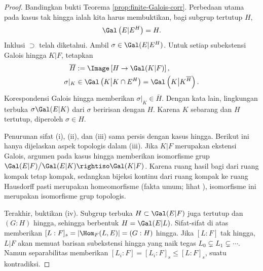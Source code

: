 \begin{proof}
	Bandingkan bukti Teorema \ref{prop:finite-Galois-corr}. Perbedaan utama pada kasus tak hingga ialah kita harus membuktikan, bagi subgrup tertutup $H$,
	\[ \Gal\left( E|E^H \right) = H. \]
	Inklusi $\supset$ telah diketahui. Ambil $\sigma\in\Gal(E|E^H)$. Untuk setiap subekstensi Galois hingga $K|F$, tetapkan
	\begin{align*}
		\overline{H} & := \Image\left[ H \to \Gal(K|F) \right], \\
		\sigma|_K & \in \Gal\left( K \big| K \cap E^H \right) = \Gal\left( K \big| K^{\overline{H}} \right).
	\end{align*}
	Korespondensi Galois hingga memberikan $\sigma|_K\in\overline{H}$. Dengan kata lain, lingkungan terbuka $\sigma\Gal(E|K)$ dari $\sigma$ beririsan dengan $H$. Karena $K$ sebarang dan $H$ tertutup, diperoleh $\sigma\in H$.

	Penurunan sifat (i), (ii), dan (iii) sama persis dengan kasus hingga. Berikut ini hanya dijelaskan aspek topologis dalam (iii). Jika $K|F$ merupakan ekstensi Galois, argumen pada kasus hingga memberikan isomorfisme grup $\Gal(E|F)\big/ \Gal(E|K) \rightiso \Gal(K|F)$. Karena ruang hasil bagi dari ruang kompak tetap kompak, sedangkan bijeksi kontinu dari ruang kompak ke ruang Hausdorff pasti merupakan homeomorfisme (fakta umum; lihat \cite[Korolari 7.2.9]{Xiong}), isomorfisme ini merupakan isomorfisme grup topologis.

	Terakhir, buktikan (iv). Subgrup terbuka $H \subset \Gal(E|F)$ juga tertutup dan $(G:H)$ hingga, sehingga berbentuk $H = \Gal(E|L)$. Sifat-sifat di atas memberikan $[L:F]_s = |\Hom_F(L, E)| = (G:H)$ hingga. Jika $[L:F]$ tak hingga, $L|F$ akan memuat barisan subekstensi hingga yang naik tegas $L_0 \subsetneq L_1 \subsetneq \cdots$. Namun separabilitas memberikan $[L_i:F] = [L_i:F]_s \leq [L:F]_s$, suatu kontradiksi.
\end{proof}

